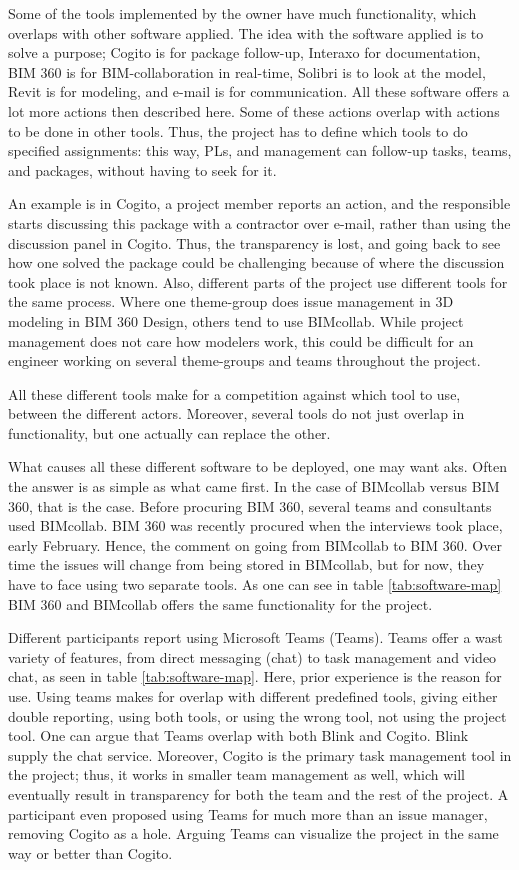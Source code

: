 Some of the tools implemented by the owner have much functionality, which overlaps with other software applied. The idea with the software applied is to solve a purpose; Cogito is for package follow-up, Interaxo for documentation, BIM 360 is for BIM-collaboration in real-time, Solibri is to look at the model, Revit is for modeling, and e-mail is for communication. All these software offers a lot more actions then described here. Some of these actions overlap with actions to be done in other tools. Thus, the project has to define which tools to do specified assignments: this way, PLs, and management can follow-up tasks, teams, and packages, without having to seek for it. 

An example is in Cogito, a project member reports an action, and the responsible starts discussing this package with a contractor over e-mail, rather than using the discussion panel in Cogito. Thus, the transparency is lost, and going back to see how one solved the package could be challenging because of where the discussion took place is not known. Also, different parts of the project use different tools for the same process. Where one theme-group does issue management in 3D modeling in BIM 360 Design, others tend to use BIMcollab. While project management does not care how modelers work, this could be difficult for an engineer working on several theme-groups and teams throughout the project.

All these different tools make for a competition against which tool to use, between the different actors. Moreover, several tools do not just overlap in functionality, but one actually can replace the other. 

What causes all these different software to be deployed, one may want aks. Often the answer is as simple as what came first. In the case of BIMcollab versus BIM 360, that is the case. Before procuring BIM 360, several teams and consultants used BIMcollab. BIM 360 was recently procured when the interviews took place, early February. Hence, the comment on going from BIMcollab to BIM 360. Over time the issues will change from being stored in BIMcollab, but for now, they have to face using two separate tools. As one can see in table \ref{tab:software-map} BIM 360 and BIMcollab offers the same functionality for the project.

Different participants report using Microsoft Teams (Teams). Teams offer a wast variety of features, from direct messaging (chat) to task management and video chat, as seen in table \ref{tab:software-map}. Here, prior experience is the reason for use. Using teams makes for overlap with different predefined tools, giving either double reporting, using both tools, or using the wrong tool, not using the project tool. One can argue that Teams overlap with both Blink and Cogito. Blink supply the chat service. Moreover, Cogito is the primary task management tool in the project; thus, it works in smaller team management as well, which will eventually result in transparency for both the team and the rest of the project. A participant even proposed using Teams for much more than an issue manager, removing Cogito as a hole. Arguing Teams can visualize the project in the same way or better than Cogito.

